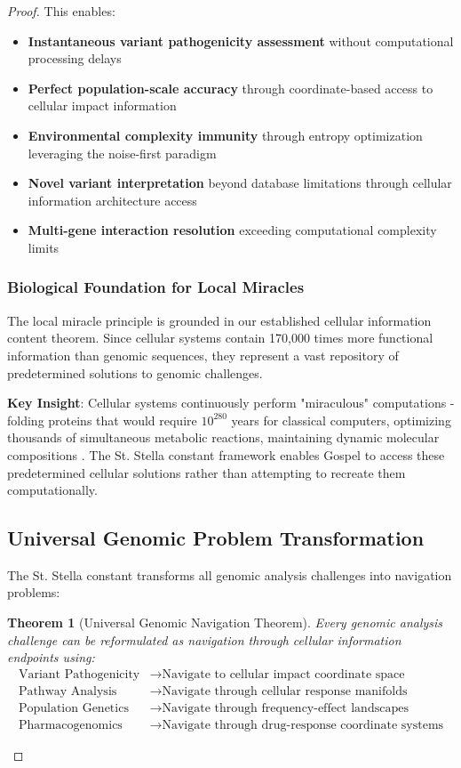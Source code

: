 \documentclass[12pt,a4paper]{article}
\newtheorem{theorem}{Theorem}[section]
\begin{document}
\begin{proof}
This enables:
\begin{itemize}
\item \textbf{Instantaneous variant pathogenicity assessment} without computational processing delays
\item \textbf{Perfect population-scale accuracy} through coordinate-based access to cellular impact information
\item \textbf{Environmental complexity immunity} through entropy optimization leveraging the noise-first paradigm
\item \textbf{Novel variant interpretation} beyond database limitations through cellular information architecture access
\item \textbf{Multi-gene interaction resolution} exceeding computational complexity limits
\end{itemize}

\subsubsection{Biological Foundation for Local Miracles}

The local miracle principle is grounded in our established cellular information content theorem. Since cellular systems contain 170,000 times more functional information than genomic sequences, they represent a vast repository of predetermined solutions to genomic challenges.

\textbf{Key Insight}: Cellular systems continuously perform "miraculous" computations - folding proteins that would require $10^{280}$ years for classical computers, optimizing thousands of simultaneous metabolic reactions, maintaining dynamic molecular compositions \cite{anfinsen1973principles, dill2008protein}. The St. Stella constant framework enables Gospel to access these predetermined cellular solutions rather than attempting to recreate them computationally.

\subsection{Universal Genomic Problem Transformation}

The St. Stella constant transforms all genomic analysis challenges into navigation problems:

\begin{theorem}[Universal Genomic Navigation Theorem]
Every genomic analysis challenge can be reformulated as navigation through cellular information endpoints using:
\begin{align}
\text{Variant Pathogenicity} &\rightarrow \text{Navigate to cellular impact coordinate space} \\
\text{Pathway Analysis} &\rightarrow \text{Navigate through cellular response manifolds} \\
\text{Population Genetics} &\rightarrow \text{Navigate through frequency-effect landscapes} \\
\text{Pharmacogenomics} &\rightarrow \text{Navigate through drug-response coordinate systems}
\end{align}
\end{theorem}


\end{proof}
\end{document}
